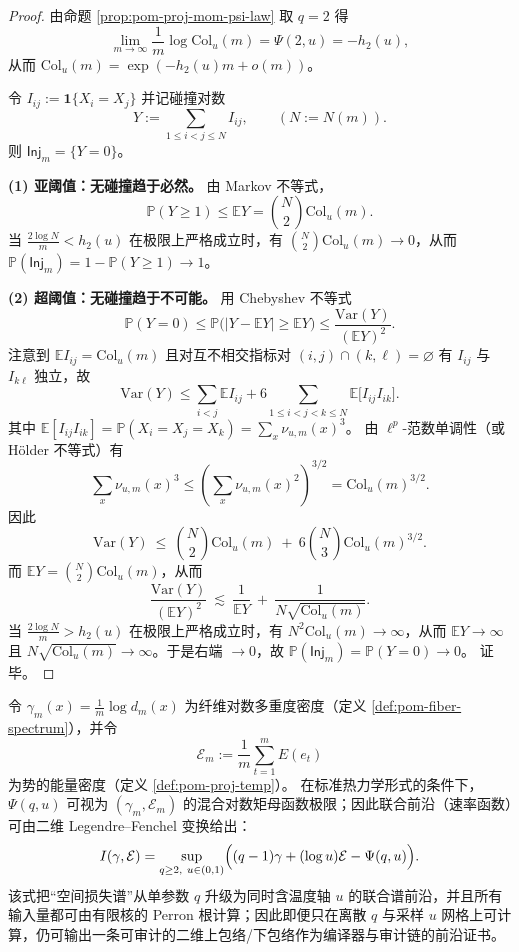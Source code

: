 \begin{proof}
由命题 \ref{prop:pom-proj-mom-psi-law} 取 \(q=2\) 得
\[
\lim_{m\to\infty}\frac{1}{m}\log \mathrm{Col}_u(m)
=\Psi(2,u)
=-h_2(u),
\]
从而 \(\mathrm{Col}_u(m)=\exp(-h_2(u)m+o(m))\)。
\par
令
\(
I_{ij}:=\mathbf{1}\{X_i=X_j\}
\)
并记碰撞对数
\[
Y:=\sum_{1\le i<j\le N} I_{ij},\qquad (N:=N(m)).
\]
则 \(\mathsf{Inj}_m=\{Y=0\}\)。
\par
\textbf{(1) 亚阈值：无碰撞趋于必然。}
由 Markov 不等式，
\[
\mathbb{P}(Y\ge 1)\le \mathbb{E}Y=\binom{N}{2}\mathrm{Col}_u(m).
\]
当 \(\frac{2\log N}{m}<h_2(u)\) 在极限上严格成立时，有
\(
\binom{N}{2}\mathrm{Col}_u(m)\to 0
\)，从而 \(\mathbb{P}(\mathsf{Inj}_m)=1-\mathbb{P}(Y\ge 1)\to 1\)。
\par
\textbf{(2) 超阈值：无碰撞趋于不可能。}
用 Chebyshev 不等式
\[
\mathbb{P}(Y=0)
\le
\mathbb{P}\bigl(|Y-\mathbb{E}Y|\ge \mathbb{E}Y\bigr)
\le
\frac{\mathrm{Var}(Y)}{(\mathbb{E}Y)^2}.
\]
注意到 \(\mathbb{E}I_{ij}=\mathrm{Col}_u(m)\) 且对互不相交指标对 \((i,j)\cap(k,\ell)=\varnothing\) 有 \(I_{ij}\) 与 \(I_{k\ell}\) 独立，故
\[
\mathrm{Var}(Y)
\le
\sum_{i<j}\mathbb{E}I_{ij}
 + 6\!\!\sum_{1\le i<j<k\le N}\!\!\mathbb{E}\bigl[I_{ij}I_{ik}\bigr].
\]
其中
\(
\mathbb{E}[I_{ij}I_{ik}]
=\mathbb{P}(X_i=X_j=X_k)
=\sum_x \nu_{u,m}(x)^3
\)。
由 \(\ell^p\)-范数单调性（或 Hölder 不等式）有
\[
\sum_x \nu_{u,m}(x)^3
\le
\left(\sum_x \nu_{u,m}(x)^2\right)^{3/2}
=\mathrm{Col}_u(m)^{3/2}.
\]
因此
\[
\mathrm{Var}(Y)\ \le\ \binom{N}{2}\mathrm{Col}_u(m)\ +\ 6\binom{N}{3}\mathrm{Col}_u(m)^{3/2}.
\]
而 \(\mathbb{E}Y=\binom{N}{2}\mathrm{Col}_u(m)\)，从而
\[
\frac{\mathrm{Var}(Y)}{(\mathbb{E}Y)^2}
\ \lesssim\
\frac{1}{\mathbb{E}Y}
\ +\
\frac{1}{N\sqrt{\mathrm{Col}_u(m)}}.
\]
当 \(\frac{2\log N}{m}>h_2(u)\) 在极限上严格成立时，有 \(N^2\mathrm{Col}_u(m)\to\infty\)，从而 \(\mathbb{E}Y\to\infty\) 且 \(N\sqrt{\mathrm{Col}_u(m)}\to\infty\)。于是右端 \(\to 0\)，故 \(\mathbb{P}(\mathsf{Inj}_m)=\mathbb{P}(Y=0)\to 0\)。
证毕。
\end{proof}

\begin{remark}\label{rem:pom-psi-2d-legendre-front}
令 \(\gamma_m(x)=\frac{1}{m}\log d_m(x)\) 为纤维对数多重度密度（定义 \ref{def:pom-fiber-spectrum}），并令
\[
\mathcal{E}_m:=\frac{1}{m}\sum_{t=1}^m E(e_t)
\]
为势的能量密度（定义 \ref{def:pom-proj-temp}）。
在标准热力学形式的条件下，\(\Psi(q,u)\) 可视为 \((\gamma_m,\mathcal{E}_m)\) 的混合对数矩母函数极限；因此联合前沿（速率函数）可由二维 Legendre--Fenchel 变换给出：
\[
I(\gamma,\mathcal{E})
=\sup_{q\ge 2,\ u\in(0,1)}
\Bigl((q-1)\gamma+(\log u)\mathcal{E}-\Psi(q,u)\Bigr).
\]
该式把“空间损失谱”从单参数 \(q\) 升级为同时含温度轴 \(u\) 的联合谱前沿，并且所有输入量都可由有限核的 Perron 根计算；因此即便只在离散 \(q\) 与采样 \(u\) 网格上可计算，仍可输出一条可审计的二维上包络/下包络作为编译器与审计链的前沿证书。
\end{remark}

